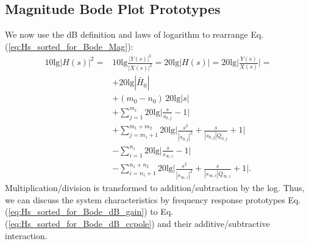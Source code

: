 \documentclass[a4paper,11pt,oneside]{scrartcl}
\newcommand{\eq}[1]{Eq. (\ref{#1})}
\begin{document}
\subsection{Magnitude Bode Plot Prototypes}
We now use the dB definition and laws of logarithm to rearrange \eq{eq:Hs_sorted_for_Bode_Mag}:
\begin{align}
10 \text{lg} |H(s)|^2 =
& 10 \text{lg} \frac{|Y(s)|^2}{|X(s)|^2} =
20 \text{lg} |H(s)| = 20 \text{lg} \bigg|\frac{Y(s)}{X(s)}\bigg| =\nonumber\\
\label{eq:Hs_sorted_for_Bode_dB_gain}
& +20 \text{lg} |\tilde{H_0}|\\
\label{eq:Hs_sorted_for_Bode_dB_origin}
& +(m_0-n_0) \, 20 \text{lg} |s|\\
\label{eq:Hs_sorted_for_Bode_dB_zero}
& +\sum\limits_{j=1}^{m_1} 20 \text{lg}  \bigg|\frac{s}{s_{0,j}}-1\bigg|\\
\label{eq:Hs_sorted_for_Bode_dB_cczero}
& +\sum\limits_{j=m_1+1}^{m_1+m_2} 20 \text{lg} \bigg|\frac{s^2}{|s_{0,j}|^2} + \frac{s}{|s_{0,j}| Q_{0,j}} + 1\bigg|\\
\label{eq:Hs_sorted_for_Bode_dB_pole}
&-\sum\limits_{i=1}^{n_1} 20 \text{lg} \bigg|\frac{s}{s_{\infty,i}}-1\bigg|\\
\label{eq:Hs_sorted_for_Bode_dB_ccpole}
&-\sum\limits_{i=n_1+1}^{n_1+n_2} 20 \text{lg} \bigg|\frac{s^2}{|s_{\infty,i}|^2} + \frac{s}{|s_{\infty,i}| Q_{\infty,i}} + 1\bigg|.
\end{align}
%
Multiplication/division is transformed to addition/subtraction by the log.
Thus, we can discuss the system characteristics by frequency response prototypes \eq{eq:Hs_sorted_for_Bode_dB_gain} to \eq{eq:Hs_sorted_for_Bode_dB_ccpole} and their additive/subtractive interaction.
\end{document}
